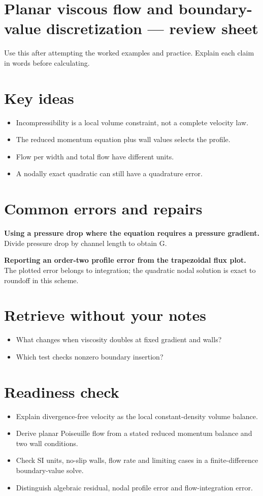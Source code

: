 \documentclass[11pt,letterpaper]{article}
\theoremstyle{definition}\newtheorem{definition}{Definition}\newtheorem{example}{Example}
\numberwithin{equation}{section}
\begin{document}
\section*{Planar viscous flow and boundary-value discretization --- review sheet}
Use this after attempting the worked examples and practice. Explain each claim in words before calculating.

\section*{Key ideas}
\begin{itemize}
\item Incompressibility is a local volume constraint, not a complete velocity law.
\item The reduced momentum equation plus wall values selects the profile.
\item Flow per width and total flow have different units.
\item A nodally exact quadratic can still have a quadrature error.
\end{itemize}
\section*{Common errors and repairs}
\textbf{Using a pressure drop where the equation requires a pressure gradient.} Divide pressure drop by channel length to obtain G.

\textbf{Reporting an order-two profile error from the trapezoidal flux plot.} The plotted error belongs to integration; the quadratic nodal solution is exact to roundoff in this scheme.

\section*{Retrieve without your notes}
\begin{itemize}
\item What changes when viscosity doubles at fixed gradient and walls?
\item Which test checks nonzero boundary insertion?
\end{itemize}
\section*{Readiness check}
\begin{itemize}
\item Explain divergence-free velocity as the local constant-density volume balance.
\item Derive planar Poiseuille flow from a stated reduced momentum balance and two wall conditions.
\item Check SI units, no-slip walls, flow rate and limiting cases in a finite-difference boundary-value solve.
\item Distinguish algebraic residual, nodal profile error and flow-integration error.
\end{itemize}
\end{document}
